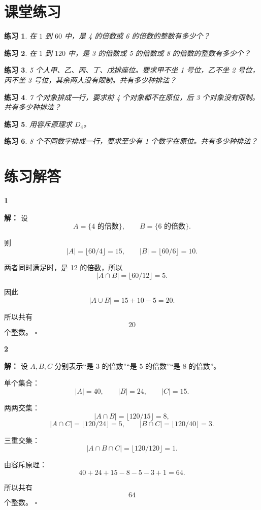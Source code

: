 \documentclass[11pt,a4paper,fontset=fandol]{ctexart}
\theoremstyle{formaltheorem}
\theoremstyle{formalexample}
\newtheorem{exercise}{练习}[section]
\newenvironment{solution}{\par\noindent\textbf{解：}}{\hfill$\square$\par}
\begin{document}
\section{课堂练习}

\begin{exercise}
在 $1$ 到 $60$ 中，是 4 的倍数或 6 的倍数的整数有多少个？
\end{exercise}

\begin{exercise}
在 $1$ 到 $120$ 中，是 3 的倍数或 5 的倍数或 8 的倍数的整数有多少个？
\end{exercise}

\begin{exercise}
5 个人甲、乙、丙、丁、戊排座位。要求甲不坐 1 号位，乙不坐 2 号位，丙不坐 3 号位，其余两人没有限制。共有多少种排法？
\end{exercise}

\begin{exercise}
7 个对象排成一行，要求前 4 个对象都不在原位，后 3 个对象没有限制。共有多少种排法？
\end{exercise}

\begin{exercise}
用容斥原理求 $D_4$。
\end{exercise}

\begin{exercise}
8 个不同数字排成一行，要求至少有 1 个数字在原位。共有多少种排法？
\end{exercise}

\newpage
\appendix
\section{练习解答}

\textbf{1}\begin{solution}
设
\[
A=\{\text{4 的倍数}\},\qquad B=\{\text{6 的倍数}\}.
\]

则
\[
|A|=\lfloor 60/4\rfloor=15,
\qquad
|B|=\lfloor 60/6\rfloor=10.
\]

两者同时满足时，是 12 的倍数，所以
\[
|A\cap B|=\lfloor 60/12\rfloor=5.
\]

因此
\[
|A\cup B|=15+10-5=20.
\]

所以共有
\[
20
\]
个整数。
\end{solution}

\textbf{2}\begin{solution}
设 $A,B,C$ 分别表示“是 3 的倍数”“是 5 的倍数”“是 8 的倍数”。

单个集合：
\[
|A|=40,\qquad |B|=24,\qquad |C|=15.
\]

两两交集：
\[
|A\cap B|=\lfloor 120/15\rfloor=8,
\]
\[
|A\cap C|=\lfloor 120/24\rfloor=5,
\qquad
|B\cap C|=\lfloor 120/40\rfloor=3.
\]

三重交集：
\[
|A\cap B\cap C|=\lfloor 120/120\rfloor=1.
\]

由容斥原理：
\[
40+24+15-8-5-3+1=64.
\]

所以共有
\[
64
\]
个整数。
\end{solution}
\end{document}
